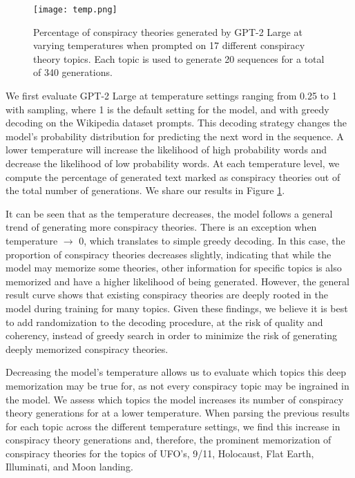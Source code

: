 \documentclass[11pt,a4paper]{article}
\begin{document}
\begin{figure}[t]
  \centering
  \texttt{[image: temp.png]}
  \caption{Percentage of conspiracy theories generated by GPT-2 Large at varying temperatures when prompted on 17 different conspiracy theory topics. Each topic is used to generate 20 sequences for a total of 340 generations.}\label{fig:temp}
\end{figure}

 We first evaluate GPT-2 Large at temperature settings ranging from 0.25 to 1 with sampling, where 1 is the default setting for the model, and with greedy decoding on the Wikipedia dataset prompts. This decoding strategy changes the model's probability distribution for predicting the next word in the sequence. A lower temperature will increase the likelihood of high probability words and decrease the likelihood of low probability words. At each temperature level, we compute the percentage of generated text marked as conspiracy theories out of the total number of generations. We share our results in Figure \ref{fig:temp}. 

It can be seen that as the temperature decreases, the model follows a general trend of generating more conspiracy theories. There is an exception when temperature $\rightarrow$ 0, which translates to simple greedy decoding. In this case, the proportion of conspiracy theories decreases slightly, indicating that while the model may memorize some theories, other information for specific topics is also memorized and have a higher likelihood of being generated. However, the general result curve shows that existing conspiracy theories are deeply rooted in the model during training for many topics. Given these findings, we believe it is best to add randomization to the decoding procedure, at the risk of quality and coherency, instead of greedy search in order to minimize the risk of generating deeply memorized conspiracy theories.  

Decreasing the model's temperature allows us to evaluate which topics this deep memorization may be true for, as not every conspiracy topic may be ingrained in the model. We assess which topics the model increases its number of conspiracy theory generations for at a lower temperature. When parsing the previous results for each topic across the different temperature settings, we find this increase in conspiracy theory generations and, therefore, the prominent memorization of conspiracy theories for the topics of UFO's, 9/11, Holocaust, Flat Earth, Illuminati, and Moon landing.  
\end{document}

